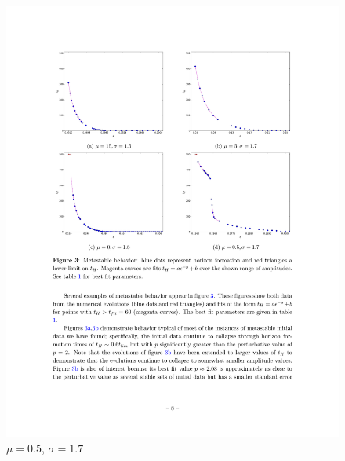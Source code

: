 \documentclass[mathserif,10pt]{beamer}
\begin{document}
{{\begin{columns}
\begin{figure}
    \includegraphics[scale=0.75]{m05w17} \\ $\mu = 0.5$, $\sigma = 1.7$
    \end{figure}
  \end{columns}
}

}
\end{document}
